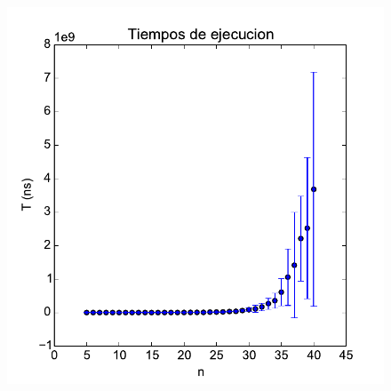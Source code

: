 \begin{figure}[ht]
	\includegraphics[scale=0.45]{images/graph_ej1/output_backtracking_1_2n}
\end{figure}